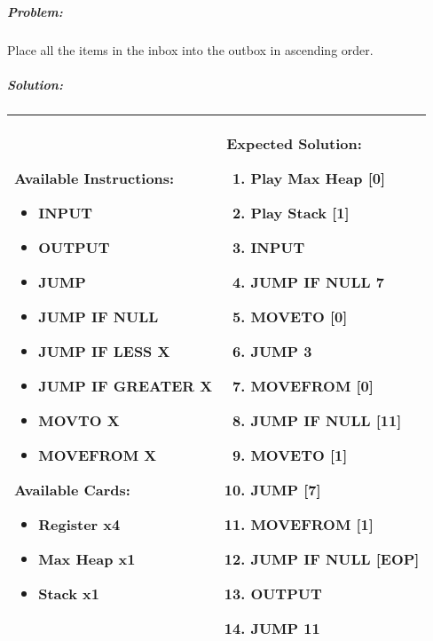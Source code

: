 \subparagraph{Problem:} Place all the items in the inbox into the outbox in ascending order.

\newpage
\subparagraph{Solution:} 
\begin{center}
    \begin{tabular}{ | m{5cm} | m{9cm} | } 
        \hline
            \textbf{Available Instructions:} 
            \begin{itemize}
                \setlength\itemsep{-.35em}
                \item INPUT
                \item OUTPUT
                \item JUMP
                \item JUMP IF NULL
                \item JUMP IF LESS X
                \item JUMP IF GREATER X
                \item MOVTO X
                \item MOVEFROM X
            \end{itemize}
            \textbf{Available Cards:} 
            \begin{itemize}
                \setlength\itemsep{-.35em}
                \item Register x4
                \item Max Heap x1
                \item Stack x1
            \end{itemize}& 
            \textbf{Expected Solution:} 
            \begin{enumerate}
                \setlength\itemsep{-.35em}
                \item Play Max Heap [0]
                \item Play Stack [1]
                \item INPUT
                \item JUMP IF NULL 7
                \item MOVETO [0]
                \item JUMP 3
                \item MOVEFROM [0]
                \item JUMP IF NULL [11]
                \item MOVETO [1]
                \item JUMP [7]
                \item MOVEFROM [1]
                \item JUMP IF NULL [EOP]
                \item OUTPUT
                \item JUMP 11
            \end{enumerate}
            \\
        \hline
    \end{tabular}
\end{center}